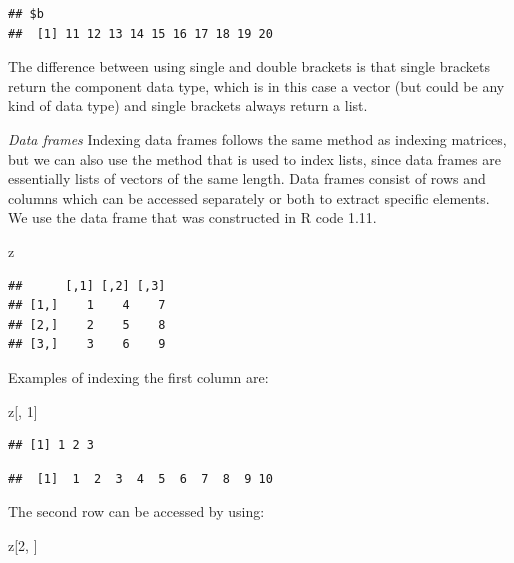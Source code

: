 \documentclass[]{book}
\newenvironment{Shaded}{\begin{snugshade}}{\end{snugshade}}
\newcommand{\DecValTok}[1]{\textcolor[rgb]{0.00,0.00,0.81}{#1}}
\newcommand{\OperatorTok}[1]{\textcolor[rgb]{0.81,0.36,0.00}{\textbf{#1}}}
\newcommand{\NormalTok}[1]{#1}
\theoremstyle{definition}
\theoremstyle{definition}
\theoremstyle{definition}
\theoremstyle{remark}
\begin{document}
\begin{verbatim}
## $b
##  [1] 11 12 13 14 15 16 17 18 19 20
\end{verbatim}

The difference between using single and double brackets is that single
brackets return the component data type, which is in this case a vector
(but could be any kind of data type) and single brackets always return a
list.

\emph{Data frames} Indexing data frames follows the same method as
indexing matrices, but we can also use the method that is used to index
lists, since data frames are essentially lists of vectors of the same
length. Data frames consist of rows and columns which can be accessed
separately or both to extract specific elements. We use the data frame
that was constructed in R code 1.11.

\begin{Shaded}
\begin{Highlighting}[]
\NormalTok{z}
\end{Highlighting}
\end{Shaded}

\begin{verbatim}
##      [,1] [,2] [,3]
## [1,]    1    4    7
## [2,]    2    5    8
## [3,]    3    6    9
\end{verbatim}

Examples of indexing the first column are:

\begin{Shaded}
\begin{Highlighting}[]
\NormalTok{z[, }\DecValTok{1}\NormalTok{]}
\end{Highlighting}
\end{Shaded}

\begin{verbatim}
## [1] 1 2 3
\end{verbatim}

\begin{Shaded}
\end{Shaded}

\begin{verbatim}
##  [1]  1  2  3  4  5  6  7  8  9 10
\end{verbatim}

The second row can be accessed by using:

\begin{Shaded}
\begin{Highlighting}[]
\NormalTok{z[}\DecValTok{2}\NormalTok{, ]}
\end{Highlighting}
\end{Shaded}
\end{document}
